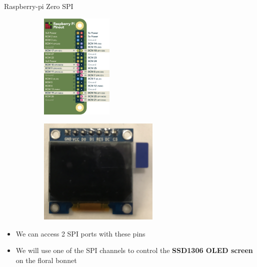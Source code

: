 \begin{frame}
   {Raspberry-pi Zero SPI}
   \begin{figure}[H]
      \centering
      \begin{subfigure}{0.4\textwidth}
         \centering
         \includegraphics[height=2in]{IMAGES/rpi-pins-spi}
      \end{subfigure}
      \begin{subfigure}{0.4\textwidth}
         \centering
         \includegraphics[height=2in]{IMAGES/SSD1306}
      \end{subfigure}
   \end{figure}
   \begin{itemize}
      \item We can access 2 SPI ports with these pins
      \item We will use one of the SPI channels to control the
	      \textbf{SSD1306 OLED screen} on the floral bonnet
   \end{itemize}
\end{frame}

\cprotect{}

